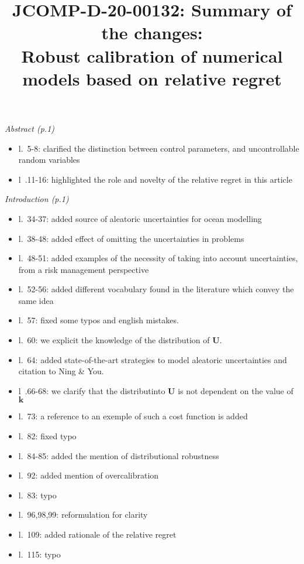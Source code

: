 \documentclass[a4paper,11pt]{article}
\begin{document}
\title{JCOMP-D-20-00132: Summary of the changes:\\
  Robust calibration of numerical models based on relative regret
}


\maketitle
\emph{Abstract (p.1)}
\begin{itemize}  
\item l.~5-8: clarified the distinction between control parameters, and uncontrollable random variables
\item l~.11-16: highlighted the role and novelty of the relative regret in this article
\end{itemize}
\emph{Introduction (p.1)}
\begin{itemize}
\item l.~34-37: added source of aleatoric uncertainties for ocean modelling
\item l.~38-48: added effect of omitting the uncertainties in problems
\item l.~48-51: added examples of the necessity of taking into account uncertainties, from a risk management perspective
\item l.~52-56: added different vocabulary found in the literature which convey the same idea
\item l.~57: fixed some typos and english mistakes.
\item l.~60: we explicit the knowledge of the distribution of $\mathbf{U}$.
\item l.~64: added state-of-the-art strategies to model aleatoric uncertainties and citation to Ning \& You.
\item l~.66-68: we clarify that the distributinto $\mathbf{U}$ is not dependent on the value of $\mathbf{k}$
\item l.~73: a reference to an exemple of such a cost function is added
\item l.~82: fixed typo
\item l.~84-85: added the mention of distributional robustness 
\item l.~92: added mention of overcalibration
\item l.~83: typo
\item l.~96,98,99: reformulation for clarity
\item l.~109: added rationale of the relative regret
\item l.~115: typo
\end{itemize}
\end{document}
